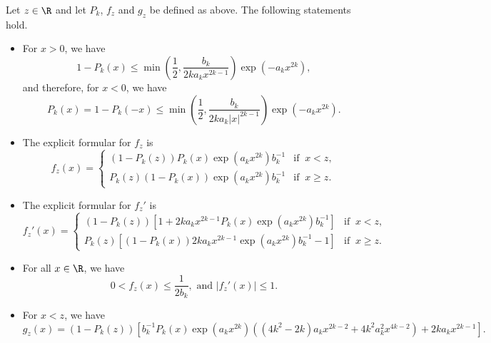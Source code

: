 	\begin{lemma}\label{lem.properties.of.solution}
		Let $z\in\R$ and let $P_k$, $f_z$ and $g_z$ be defined as above. The following statements hold.
		\begin{itemize}
			\item[(i)] For $x>0$, we have
			\begin{equation}\label{mills.ratio1}
				1-P_k(x) \le \min \left(\frac{1}{2}, \frac{b_k}{2 k a_k x^{2 k-1}}\right) \exp \left(-a_k x^{2 k}\right),
			\end{equation}
and therefore, for $x<0$, we have
			\begin{equation}\label{mills.ratio2}
				P_k(x)=1-P_k(-x) \le \min \left(\frac{1}{2}, \frac{b_k}{2 k a_k |x|^{2 k-1}}\right) \exp \left(-a_k x^{2 k}\right).
			\end{equation}
			\item[(ii)] The explicit formular for $f_z$ is
			\begin{equation}\label{sol03}
				f_z(x) =
				\begin{cases}
					(1-P_k(z))P_k(x)\exp({a_kx^{2k}})b_k^{-1} &\text{if }\ x < z,\\
					P_k(z)(1-P_k(x))\exp({a_kx^{2k}})b_k^{-1} &\text{if }\ x \ge z.
				\end{cases} 
			\end{equation}
			\item[(iii)] The explicit formular for $f_{z}'$ is
			\begin{equation}\label{sol15}
				f_{z}'(x) =
				\begin{cases}
					(1-P_k(z))\left[1 + 2ka_kx^{2k-1}P_k(x)\exp({a_kx^{2k}})b_k^{-1}\right] &\text{if }\ x < z,\\
					P_k(z)\left[(1-P_k(x))2ka_kx^{2k-1}\exp({a_kx^{2k}})b_k^{-1}-1\right] &\text{if }\ x \ge  z. 
				\end{cases} 
			\end{equation}
			\item[(iv)] 
			For all $x\in\R$, we have
			\begin{equation}\label{sol07}
				0 < f_z(x) \le \dfrac{1}{2b_k}, \text{ and }
				|f_{z}'(x)| \le 1.
			\end{equation}
			\item[(v)] For $x< z$, we have
			\begin{equation*}\label{estimate.lem1.24}
				g_z(x)=(1-P_k(z))\left[b_{k}^{-1}P_k(x)\exp(a_kx^{2k}) \left((4k^2-2k)a_kx^{2k-2} + 4k^2a_k^2x^{4k-2}\right) + 2ka_kx^{2k-1}\right].
			\end{equation*}
		\end{itemize}
	\end{lemma}
	
